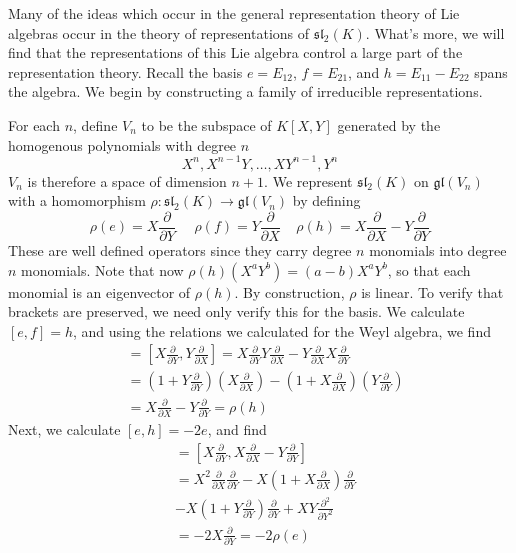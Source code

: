 Many of the ideas which occur in the general representation theory of Lie algebras occur in the theory of representations of $\mathfrak{sl}_2(K)$. What's more, we will find that the representations of this Lie algebra control a large part of the representation theory. Recall the basis $e = E_{12}$, $f = E_{21}$, and $h = E_{11} - E_{22}$ spans the algebra. We begin by constructing a family of irreducible representations.

For each $n$, define $V_n$ to be the subspace of $K[X,Y]$ generated by the homogenous polynomials with degree $n$
%
\[ X^n, X^{n-1}Y, \dots, XY^{n-1}, Y^n \]
%
$V_n$ is therefore a space of dimension $n+1$. We represent $\mathfrak{sl}_2(K)$ on $\mathfrak{gl}(V_n)$ with a homomorphism $\rho: \mathfrak{sl}_2(K) \to \mathfrak{gl}(V_n)$ by defining
%
\[ \rho(e) = X \frac{\partial}{\partial Y} \ \ \ \ \ \ \rho(f) = Y \frac{\partial}{\partial X}\ \ \ \ \ \rho(h) = X \frac{\partial}{\partial X} - Y \frac{\partial}{\partial Y} \]
%
These are well defined operators since they carry degree $n$ monomials into degree $n$ monomials. Note that now $\rho(h)(X^aY^b) = (a - b) X^aY^b$, so that each monomial is an eigenvector of $\rho(h)$. By construction, $\rho$ is linear. To verify that brackets are preserved, we need only verify this for the basis. We calculate $[e, f] = h$, and using the relations we calculated for the Weyl algebra, we find
%
\begin{align*}
    [\rho(e),\rho(f)] &= \left[ X \frac{\partial}{\partial Y}, Y \frac{\partial}{\partial X} \right] = X \frac{\partial}{\partial Y} Y \frac{\partial}{\partial X} - Y \frac{\partial}{\partial X} X \frac{\partial}{\partial Y}\\
    &= \left(1 + Y \frac{\partial}{\partial Y} \right) \left( X \frac{\partial}{\partial X} \right) - \left( 1 + X \frac{\partial}{\partial X} \right) \left( Y \frac{\partial}{\partial Y} \right)\\
    &= X \frac{\partial}{\partial X} - Y \frac{\partial}{\partial Y} = \rho(h)
\end{align*}
%
Next, we calculate $[e, h] = -2 e$, and find
%
\begin{align*}
    [\rho(e), \rho(h)] &= \left[ X \frac{\partial}{\partial Y}, X \frac{\partial}{\partial X} - Y \frac{\partial}{\partial Y} \right]\\
    &= X^2 \frac{\partial}{\partial X} \frac{\partial}{\partial Y} - X \left(1 + X \frac{\partial}{\partial X} \right) \frac{\partial}{\partial Y}\\
    &- X \left( 1 + Y \frac{\partial}{\partial Y} \right) \frac{\partial}{\partial Y} + X Y \frac{\partial^2}{\partial Y^2}\\
    &= -2 X \frac{\partial}{\partial Y} = -2 \rho(e)
\end{align*}
